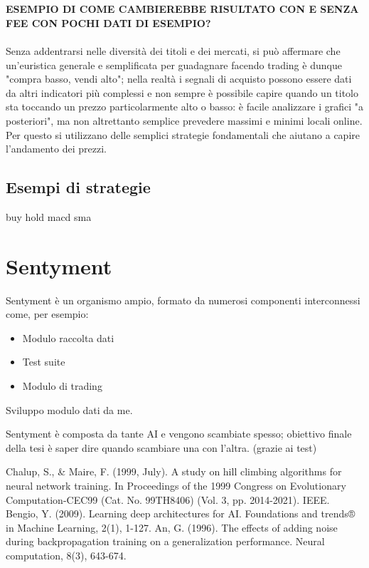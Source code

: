 \documentclass{article}
\begin{document}
		
		\\~\\
		\textbf{ESEMPIO DI COME CAMBIEREBBE RISULTATO CON E SENZA FEE CON POCHI DATI DI ESEMPIO?}
		\\~\\
		Senza addentrarsi nelle diversità dei titoli e dei mercati, si può affermare che un'euristica generale e semplificata per guadagnare facendo trading è dunque "compra basso, vendi alto"; nella realtà i segnali di acquisto possono essere dati da altri indicatori più complessi e non sempre è possibile capire quando un titolo sta toccando un prezzo particolarmente alto o basso: è facile analizzare i grafici "a posteriori", ma non altrettanto semplice prevedere massimi e minimi locali online. Per questo si utilizzano delle semplici strategie fondamentali che aiutano a capire l'andamento dei prezzi.
		
		
	\subsection{Esempi di strategie}
		buy hold macd sma
		
		
	\section{Sentyment}
		Sentyment è un organismo ampio, formato da numerosi componenti interconnessi come, per esempio:
		\begin{itemize}
			\item Modulo raccolta dati
			\item Test suite
			\item Modulo di trading
		\end{itemize}
	
	
		Sviluppo modulo dati da me.
		
		Sentyment è composta da tante AI e vengono scambiate spesso; obiettivo finale della tesi è saper dire quando scambiare una con l'altra. (grazie ai test)
	    
		
		
	    \newpage
		\cite{es}
	
		\begin{thebibliography}{9}
			Chalup, S., \& Maire, F. (1999, July). A study on hill climbing algorithms for neural network training. In Proceedings of the 1999 Congress on Evolutionary Computation-CEC99 (Cat. No. 99TH8406) (Vol. 3, pp. 2014-2021). IEEE.
			\bibitem{}
			Bengio, Y. (2009). Learning deep architectures for AI. Foundations and trends® in Machine Learning, 2(1), 1-127.
			\bibitem{}
			An, G. (1996). The effects of adding noise during backpropagation training on a generalization performance. Neural computation, 8(3), 643-674.
		\end{thebibliography}
\end{document}
